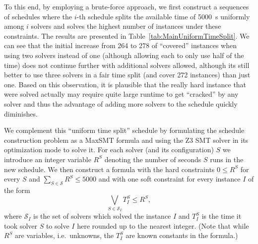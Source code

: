 \documentclass{elsarticle}
\begin{document}
To this end, by employing a brute-force approach, we first construct a sequences of schedules 
where the $i$-th schedule splits the available time of \SI{5000}{\second} uniformly among
$i$ solvers and solves the highest number of instances under these constraints.
The results are presented in Table~\ref{tab:MainUniformTimeSplit}.
We can see that the initial increase from 264 to 278 of ``covered'' instances 
when using two solvers instead of one (although allowing each to only use half of the time)
does not continue further with additional solvers allowed,
although its still better to use three solvers in a fair time split 
(and cover 272 instances) than just one.
Based on this observation, it is plausible  that the really hard 
instance that were solved actually may require quite large runtime to 
get ``cracked'' by any solver and thus the advantage of adding more solvers to the schedule
quickly diminishes.

We complement this ``uniform time split'' schedule by formulating the schedule construction problem as a MaxSMT formula and using the Z3 SMT solver \cite{DBLP:conf/tacas/MouraB08} in its optimization mode \cite{DBLP:conf/sycss/BjornerP14} to solve it.
For each solver (and its configuration) $S$ we introduce an integer variable $R^S$ denoting the number of seconds $S$ runs in the new schedule. 
We then construct a formula with the hard constraints $0 \leq R^S$ for every $S$ and $\sum_{S\in\mathcal{S}} R^S \leq 5000$ and with one soft constraint for every instance $I$ of the form \[\bigvee_{S \in \mathcal{S}_I} T^S_I \leq R^S,\]
where $\mathcal{S}_I$ is the set of solvers which solved the instance $I$ and $T^S_I$ is the time it took solver $S$ to solve $I$ here rounded up to the nearest integer.
(Note that while $R^S$ are variables, i.e.~unknowns, the $T^S_I$ are known constants in the formula.)
\end{document}
